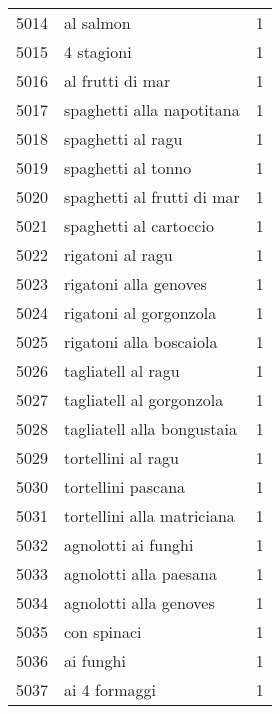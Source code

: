 \begin{tabular}{llr}
5014 &                                          al salmon &      1 \\
5015 &                                         4 stagioni &      1 \\
5016 &                                   al frutti di mar &      1 \\
5017 &                          spaghetti alla napotitana &      1 \\
5018 &                                  spaghetti al ragu &      1 \\
5019 &                                 spaghetti al tonno &      1 \\
5020 &                         spaghetti al frutti di mar &      1 \\
5021 &                             spaghetti al cartoccio &      1 \\
5022 &                                   rigatoni al ragu &      1 \\
5023 &                              rigatoni alla genoves &      1 \\
5024 &                             rigatoni al gorgonzola &      1 \\
5025 &                            rigatoni alla boscaiola &      1 \\
5026 &                                 tagliatell al ragu &      1 \\
5027 &                           tagliatell al gorgonzola &      1 \\
5028 &                         tagliatell alla bongustaia &      1 \\
5029 &                                 tortellini al ragu &      1 \\
5030 &                                 tortellini pascana &      1 \\
5031 &                         tortellini alla matriciana &      1 \\
5032 &                                agnolotti ai funghi &      1 \\
5033 &                             agnolotti alla paesana &      1 \\
5034 &                             agnolotti alla genoves &      1 \\
5035 &                                        con spinaci &      1 \\
5036 &                                          ai funghi &      1 \\
5037 &                                      ai 4 formaggi &      1 \\

\end{tabular}

